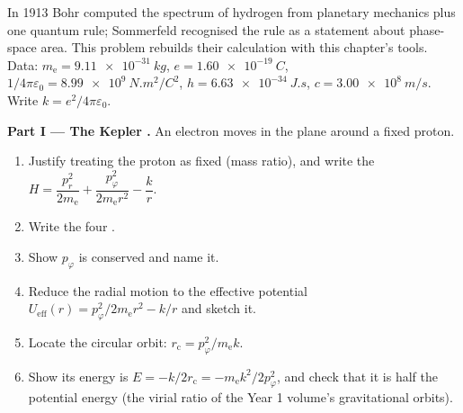 \begin{problem}\label{pb:b3:hamiltonian-mechanics:1}
In 1913 Bohr computed the spectrum of hydrogen from planetary
mechanics plus one quantum rule; Sommerfeld recognised the rule as a
statement about phase-space area. This problem rebuilds their
calculation with this chapter's tools. Data: $m_{\text{e}} =
\qty{9.11e-31}{kg}$, $e = \qty{1.60e-19}{C}$, $1/4\pi\varepsilon_0 =
\qty{8.99e9}{N.m^2/C^2}$, $h = \qty{6.63e-34}{J.s}$, $c =
\qty{3.00e8}{m/s}$. Write $k = e^2/4\pi\varepsilon_0$.

\medskip\noindent\textbf{Part I --- The Kepler .}
An electron moves in the plane around a fixed proton.
\begin{enumerate}
  \item Justify treating the proton as fixed (mass ratio), and write
        the  $H = \dfrac{p_r^2}{2m_{\text{e}}} +
        \dfrac{p_\varphi^2}{2m_{\text{e}}r^2} - \dfrac{k}{r}$.
  \item Write the four .
  \item Show $p_\varphi$ is conserved and name it.
  \item Reduce the radial motion to the effective potential
        $U_{\text{eff}}(r) = p_\varphi^2/2m_{\text{e}}r^2 - k/r$ and
        sketch it.
  \item Locate the circular orbit: $r_{\text{c}} =
        p_\varphi^2/m_{\text{e}}k$.
  \item Show its energy is $E = -k/2r_{\text{c}} =
        -m_{\text{e}}k^2/2p_\varphi^2$, and check that it is half the
        potential energy (the virial ratio of the Year 1 volume's
        gravitational orbits).
\end{enumerate}


\end{problem}
